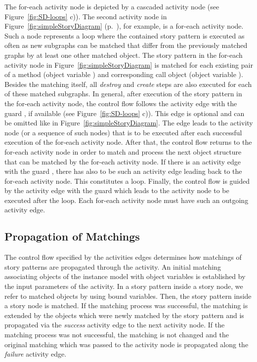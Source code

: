 The for-each activity node is depicted by a cascaded activity node (see Figure~\ref{fig:SD-loops} c)).
The second activity node in Figure~\ref{fig:simpleStoryDiagram} (p.~\pageref{fig:simpleStoryDiagram}), for example, is a for-each activity node.
Such a node represents a loop where the contained story pattern is executed as often as new subgraphs can be matched
that differ from the previously matched graphs by at least one other matched object.
The story pattern in the for-each activity node in Figure~\ref{fig:simpleStoryDiagram}
is matched for each existing pair of a method (object variable ) and corresponding call object (object variable ).
Besides the matching itself, all \emph{destroy} and \emph{create} steps are also executed for each of these matched subgraphs.
In general, after execution of the story pattern in the for-each activity node,
the control flow follows the activity edge with the guard , if available (see Figure~\ref{fig:SD-loops} c)).
This edge is optional and can be omitted like in Figure~\ref{fig:simpleStoryDiagram}.
The  edge leads to the activity node (or a sequence of such nodes)
that is to be executed after each successful execution of the for-each activity node.
After that, the control flow returns to the for-each activity node in order to match and process the next object structure that can be matched by the for-each activity node.
If there is an activity edge with the guard , there has also to be such an activity edge leading back to the for-each activity node.
This constitutes a loop.
Finally, the control flow is guided by the activity edge with the guard  which leads to the activity node to be executed after the loop.
Each for-each activity node must have such an outgoing  activity edge.


\subsection{Propagation of Matchings}
\label{sec:storydiagrams:propagation}

The control flow specified by the activities edges determines how matchings of story patterns are propagated through the activity. An initial matching associating objects of the instance model with object variables is established by the input parameters of the activity. In a story pattern inside a story node, we refer to matched objects by using bound variables. Then, the story pattern inside a story node is matched. If the matching process was successful, the matching is extended by the objects which were newly matched by the story pattern and is propagated via the \emph{success} activity edge to the next activity node. If the matching process was not successful, the matching is not changed and the original matching which was passed to the activity node is propagated along the \emph{failure} activity edge.

